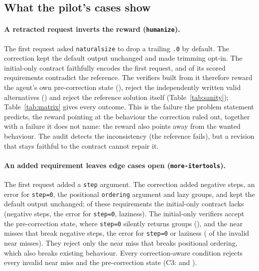 \subsection{What the pilot's cases show}
\label{sec:analysis-pilot}
\paragraph{A retracted request inverts the reward (\texttt{humanize}).} The first request asked \texttt{naturalsize} to
drop a trailing \texttt{.0} by default. The correction kept the default output unchanged and made trimming opt-in. The
initial-only contract faithfully encodes the first request, and  of its
 scored requirements contradict the reference. The verifiers built from it therefore
reward the agent's own pre-correction state (), reject the  independently written valid alternatives
() and reject the reference solution itself (Table~\ref{tab:sanity}); Table~\ref{tab:matrix} gives every
outcome. This is the failure the problem statement predicts, the reward pointing at the behaviour the correction ruled
out, together with a failure it does not name: the reward also points away from the wanted behaviour. The audit detects the
inconsistency (the reference fails), but a revision that stays faithful to the contract cannot repair it.

\paragraph{An added requirement leaves edge cases open (\texttt{more-itertools}).} The first request added a
\texttt{step} argument. The correction added negative steps, an error for \texttt{step=0}, the positional
\texttt{ordering} argument and lazy groups, and kept the default output unchanged;  of these
requirements the initial-only contract lacks (negative steps, the error for \texttt{step=0}, laziness). The initial-only verifiers
accept the pre-correction state, where \texttt{step=0} silently returns groups (), and the near misses
that break negative steps, the error for \texttt{step=0} or laziness ( of the invalid near misses). They reject
only the near miss that breaks positional ordering, which also breaks existing behaviour. Every correction-aware
condition rejects every invalid near miss and the pre-correction state (C3:  and ).

